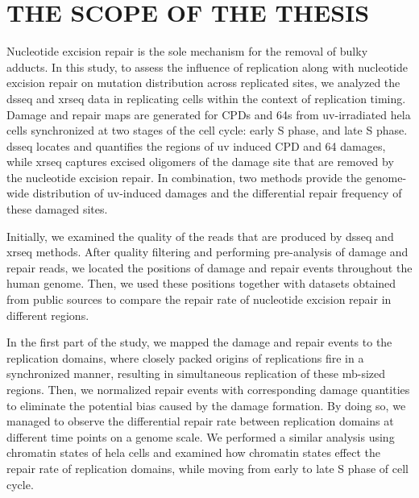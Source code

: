 \setlength{\parindent}{0pt}
\chapter{\bf THE SCOPE OF THE THESIS}

Nucleotide excision repair is the sole mechanism for the removal of bulky adducts. In this study, to assess the influence of replication along with nucleotide excision repair on mutation distribution across replicated sites, we analyzed the \gls{dsseq} and \gls{xrseq} data in replicating cells within the context of replication timing. Damage and repair maps are generated for \gls{CPD}s and \gls{64}s from \gls{uv}-irradiated \gls{hela} cells synchronized at two stages of the cell cycle: early S phase, and late S phase. \gls{dsseq} locates and quantifies the regions of \gls{uv} induced \gls{CPD} and \gls{64} damages, while \gls{xrseq} captures excised oligomers of the damage site that are removed by the nucleotide excision repair. In combination, two methods provide the genome-wide distribution of \gls{uv}-induced damages and the differential repair frequency of these damaged sites. 

Initially, we examined the quality of the reads that are produced by \gls{dsseq} and \gls{xrseq} methods. After quality filtering and performing pre-analysis of damage and repair reads, we located the positions of damage and repair events throughout the human genome. Then, we used these positions together with datasets obtained from public sources to compare the repair rate of nucleotide excision repair in different regions.

In the first part of the study, we mapped the damage and repair events to the replication domains, where closely packed origins of replications fire in a synchronized manner, resulting in simultaneous replication of these \gls{mb}-sized regions. Then, we normalized repair events with corresponding damage quantities to eliminate the potential bias caused by the damage formation. By doing so, we managed to observe the differential repair rate between replication domains at different time points on a genome scale. We performed a similar analysis using chromatin states of \gls{hela} cells and examined how chromatin states effect the repair rate of replication domains, while moving from early to late S phase of cell cycle.

